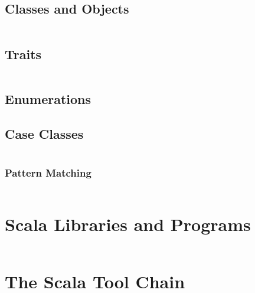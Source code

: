 \subsection{Classes and Objects}

\begin{lstlisting}[language=Scala]
\end{lstlisting}

\subsection{Traits}

\begin{lstlisting}[language=Scala]
\end{lstlisting}

\subsection{Enumerations}\label{sec:scala-enumerations}

\subsection{Case Classes}\label{sec:scala-case-classes}

\begin{lstlisting}[language=Scala]
\end{lstlisting}

\subsubsection{Pattern Matching}

\begin{lstlisting}[language=Scala]
\end{lstlisting}

\section{Scala Libraries and Programs}

\begin{lstlisting}[language=Scala]
\end{lstlisting}

\section{The Scala Tool Chain}

\begin{lstlisting}[language=Scala]
\end{lstlisting}

